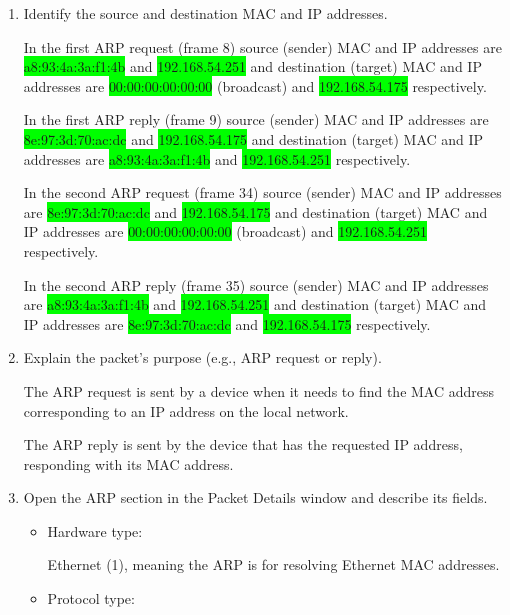 \documentclass[a4paper]{article}
\begin{document}
		\begin{enumerate}
			\item Identify the source and destination MAC and IP addresses.
			
			In the first ARP request (frame 8) source (sender) MAC and IP addresses are \colorbox{lime}{a8:93:4a:3a:f1:4b} and \colorbox{lime}{192.168.54.251} and destination (target) MAC and IP addresses are \colorbox{lime}{00:00:00:00:00:00} (broadcast) and \colorbox{lime}{192.168.54.175} respectively.
			
			In the first ARP reply (frame 9) source (sender) MAC and IP addresses are \colorbox{lime}{8e:97:3d:70:ac:dc} and \colorbox{lime}{192.168.54.175} and destination (target) MAC and IP addresses are \colorbox{lime}{a8:93:4a:3a:f1:4b} and \colorbox{lime}{192.168.54.251} respectively.
			
			In the second ARP request (frame 34) source (sender) MAC and IP addresses are \colorbox{lime}{8e:97:3d:70:ac:dc} and \colorbox{lime}{192.168.54.175} and destination (target) MAC and IP addresses are \colorbox{lime}{00:00:00:00:00:00} (broadcast) and \colorbox{lime}{192.168.54.251} respectively.
			
			In the second ARP reply (frame 35) source (sender) MAC and IP addresses are \colorbox{lime}{a8:93:4a:3a:f1:4b} and \colorbox{lime}{192.168.54.251} and destination (target) MAC and IP addresses are \colorbox{lime}{8e:97:3d:70:ac:dc} and \colorbox{lime}{192.168.54.175} respectively.
			
			\pagebreak
			
			\item Explain the packet’s purpose (e.g., ARP request or reply).
			
			The ARP request is sent by a device when it needs to find the MAC address corresponding to an IP address on the local network.
			
			The ARP reply is sent by the device that has the requested IP address, responding with its MAC address.
			
			\item Open the ARP section in the Packet Details window and describe its fields.
			
			\begin{itemize}
				\item Hardware type:
				
					Ethernet (1), meaning the ARP is for resolving Ethernet MAC addresses.
					
				\item Protocol type:
					

\end{itemize}
\end{enumerate}
\end{document}

